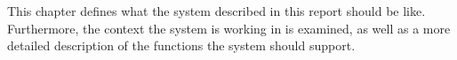 This chapter defines what the system described in this report should be like. Furthermore, the context the system is working in is examined, as well as a more detailed description of the functions the system should support.
